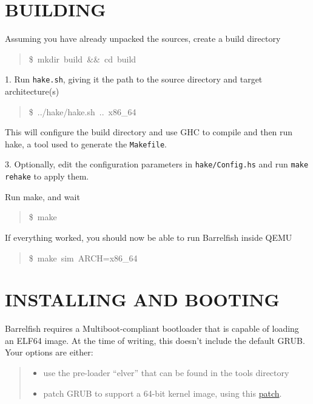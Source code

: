 \section{BUILDING%
  \label{building}%
}
\begin{list}{.}
{
\setlength{\rightmargin}{\leftmargin}
}

\item Assuming you have already unpacked the sources, create a build directory
%
\begin{quote}{\ttfamily \raggedright \noindent
\$~mkdir~build~\&\&~cd~build
}
\end{quote}
\end{list}

1. Run \texttt{hake.sh}, giving it the path to the source directory and target
architecture(s)
%
\begin{quote}{\ttfamily \raggedright \noindent
\$~../hake/hake.sh~..~x86\_64
}
\end{quote}

This will configure the build directory and use GHC to compile and then run
hake, a tool used to generate the \texttt{Makefile}.

3. Optionally, edit the configuration parameters in \texttt{hake/Config.hs} and
run \texttt{make rehake} to apply them.
\setcounter{listcnt0}{0}
\begin{list}{.}
{
\addtocounter{listcnt0}{3}
\setlength{\rightmargin}{\leftmargin}
}

\item Run make, and wait
%
\begin{quote}{\ttfamily \raggedright \noindent
\$~make
}
\end{quote}

\item If everything worked, you should now be able to run Barrelfish inside QEMU
%
\begin{quote}{\ttfamily \raggedright \noindent
\$~make~sim~ARCH=x86\_64
}
\end{quote}
\end{list}


\section{INSTALLING AND BOOTING%
  \label{installing-and-booting}%
}

Barrelfish requires a Multiboot-compliant bootloader that is capable of loading
an ELF64 image. At the time of writing, this doesn't include the default GRUB.
Your options are either:
%
\begin{quote}
%
\begin{itemize}

\item use the pre-loader ``elver'' that can be found in the tools directory

\item patch GRUB to support a 64-bit kernel image, using this \href{http://savannah.gnu.org/bugs/?17963}{patch}.

\end{itemize}

\end{quote}

